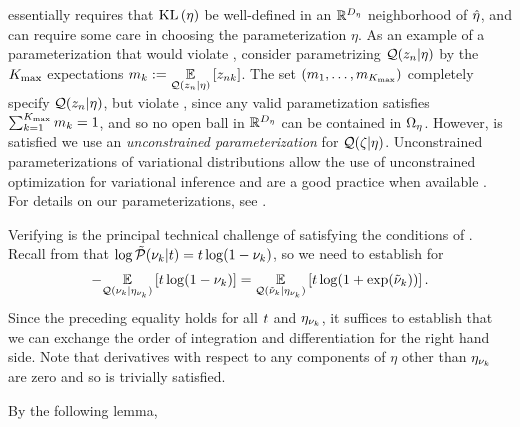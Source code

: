  essentially requires that $\mathrm{KL}\left(\eta\right)$
be well-defined in an $\mathbb{R}^{D_{\eta}}$ neighborhood of $\hat\eta$, and can
require some care in choosing the parameterization $\eta$.  As an example of a
parameterization that would violate ,
consider parametrizing $\mathcal{Q}(z_{n} \vert \eta)$ by the ${K_{\mathrm{max}}}$ expectations
$m_k := \underset{\mathcal{Q}(z_{n} \vert \eta)}{\mathbb{E}}\left[z_{nk}\right]$.  The set $(m_1, \ldots,
m_{K_{\mathrm{max}}})$ completely specify $\mathcal{Q}(z_{n} \vert \eta)$, but violate
, since any valid parametization
satisfies $\sum_{k=1}^{K_{\mathrm{max}}} m_k = 1$, and so no open ball in
$\mathbb{R}^{D_{\eta}}$ can be contained in $\Omega_{\eta}$.  However,
 is satisfied we use an {\em
unconstrained parameterization} for $\mathcal{Q}(\zeta \vert \eta)$.   Unconstrained
parameterizations of variational distributions allow the use of unconstrained
optimization for variational inference and are a good practice when available
\citep{kucukelbir:2016:advi}.  For details on our parameterizations, see
.

Verifying  is the principal technical challenge of
satisfying the conditions of . Recall from
 that $\log \tilde{\mathcal{P}}(\nu_{k} \vert t) = t \log (1 - \nu_{k})$,
so we need to establish  for
%
\begin{align*}
%
-\expect{\q(\nuk \vert \etanuk)}{t \log (1 - \nuk)} =
\expect{\q(\lnuk \vert \etanuk)}
      {t \log (1 + \exp(\lnuk))}.
%
\end{align*}
%
Since the preceding equality holds for all $t$ and $\eta_{\nu_{k}}$, it suffices to
establish that we can exchange the order of integration and differentiation for
the right hand side.  Note that derivatives with respect to any components of
$\eta$ other than $\eta_{\nu_{k}}$ are zero and so  is
trivially satisfied.


By the following lemma,




